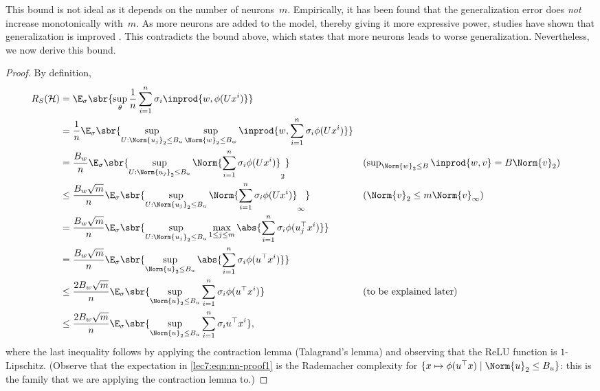 This bound is not ideal as it depends on the number of neurons~$m$. Empirically, it has been found that the generalization error does \emph{not} increase monotonically with~$m$. As more neurons are added to the model, thereby giving it more expressive power, studies have shown that generalization is improved \cite{belkin2019}. This contradicts the bound above, which states that more neurons leads to worse generalization. Nevertheless, we now derive this bound.

\begin{proof}
    By definition,
    \begin{align}
        R_S(\mathcal{H}) 
        &= \E_\sigma\sbr{ \sup_\theta \frac{1}{n} \sum_{i=1}^n \sigma_i \inprod{w,\phi(Ux\sp{i})} }
        \\&= \frac{1}{n} \E_\sigma\sbr{ \sup_{U : \Norm{u_j}_2 \leq B_u} \sup_{\Norm{w}_2 \leq B_w} \inprod{w,\sum_{i=1}^n \sigma_i \phi(Ux\sp{i})} }
        \\&= \frac{B_w}{n}\E_\sigma\sbr{ \sup_{U : \Norm{u_j}_2 \leq B_u} \Norm{ \sum_{i=1}^n \sigma_i \phi(Ux\sp{i})}_2 }
            &&\text{($\textstyle\sup_{\Norm{w}_2\leq B}\inprod{w,v} = B\Norm{v}_2$)}
        \\&\leq \frac{B_w\sqrt{m}}{n}\E_\sigma\sbr{ \sup_{U : \Norm{u_j}_2 \leq B_u} \Norm{ \sum_{i=1}^n \sigma_i \phi(Ux\sp{i})}_\infty }
            &&\text{($\Norm{v}_2 \leq m\Norm{v}_\infty$)}
        \\&= \frac{B_w\sqrt{m}}{n}\E_\sigma\sbr{ \sup_{U : \Norm{u_j}_2 \leq B_u} \max_{1\leq j\leq m} \abs{ \sum_{i=1}^n \sigma_i \phi(u_j^\top x\sp{i})} } 
        \\&= \frac{B_w\sqrt{m}}{n}\E_\sigma\sbr{ \sup_{\Norm{u}_2 \leq B_u} \abs{ \sum_{i=1}^n \sigma_i \phi(u^\top x\sp{i})} }
        \\&\leq \frac{2B_w\sqrt{m}}{n}\E_\sigma\sbr{ \sup_{\Norm{u}_2 \leq B_u} \sum_{i=1}^n \sigma_i \phi(u^\top x\sp{i}) }
            &&\text{(to be explained later)} \label{lec7:eqn:nn-proof1}
        \\&\leq \frac{2B_w\sqrt{m}}{n}\E_\sigma\sbr{ \sup_{\Norm{u}_2 \leq B_u} \sum_{i=1}^n \sigma_i u^\top x\sp{i} }, \label{lec7:eqn:nn-proof2}
    \end{align}
    where the last inequality follows by applying the contraction lemma (Talagrand's lemma) and observing that the ReLU function is $1$-Lipschitz. (Observe that the expectation in \eqref{lec7:eqn:nn-proof1} is the Rademacher complexity for $\{ x \mapsto \phi(u^\top x) \mid \Norm{u}_2 \leq B_u \}$: this is the family that we are applying the contraction lemma to.)
    

\end{proof}
